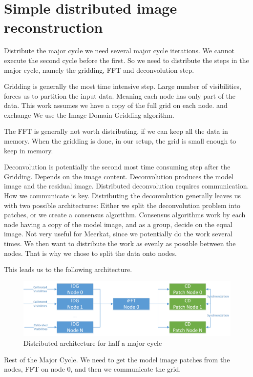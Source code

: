 \section{Simple distributed image reconstruction}\label{dist}
Distribute the major cycle we need several major cycle iterations. We cannot execute the second cycle before the first. So we need to distribute the steps in the major cycle, namely the gridding, FFT and deconvolution step. 

Gridding is generally the most time intensive step. 
Large number of visibilities, forces us to partition the input data. Meaning each node has only part of the data. This work assumes we have a copy of the full grid on each node. and exchange
We use the Image Domain Gridding algorithm.

The FFT is generally not worth distributing, if we can keep all the data in memory. When the gridding is done, in our setup, the grid is small enough to keep in memory.

Deconvolution is potentially the second most time consuming step after the Gridding.
Depends on the image content.
Deconvolution produces the model image and the residual image.
Distributed deconvolution requires communication. How we communicate is key.
Distributing the deconvolution generally leaves us with two possible architectures: Either we split the deconvolution problem into patches, or we create a consensus algorithm. Consensus algorithms work by each node having a copy of the model image, and as a group, decide on the equal image. Not very useful for Meerkat, since we potentially do the work several times. 
We then want to distribute the work as evenly as possible between the nodes. 
That is why we chose to split the data onto nodes. 


This leads us to the following architecture.
\begin{figure}[h]
	\centering
	\includegraphics[width=0.80\linewidth]{./chapters/03.distribution/distributed_architecture.png}
	\caption{Distributed architecture for half a major cycle}
	\label{dist:architecture:fig}
\end{figure}

Rest of the Major Cycle. We need to get the model image patches from the nodes, FFT on node 0, and then we communicate the grid.


